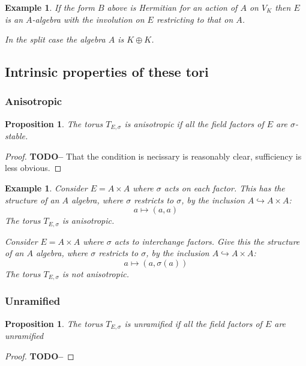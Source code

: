 \documentclass{article}
\theoremstyle{plain}
\newtheorem{proposition}[theorem]{Proposition}
\newtheorem{example}[theorem]{Example}
\theoremstyle{definition}
\numberwithin{equation}{section}
\newcommand{\TODO}[1]{\textbf{TODO-#1}}
\begin{document}
\begin{example}
If the form $B$ above is Hermitian for an action of $A$ on $V_K$ then $E$ is an $A$-algebra with the involution on $E$ restricting to that on $A$.

In the split case the algebra $A$ is $K\oplus K$.
\end{example}

\subsection{Intrinsic properties of these tori}

\subsubsection{Anisotropic}

\begin{proposition}
The torus $T_{E,\sigma}$ is anisotropic if all the field factors of $E$ are $\sigma$-stable.
\end{proposition}
\begin{proof}
\TODO-
That the condition is necissary is reasonably clear, sufficiency is less obvious.
\end{proof}

\begin{example}
Consider $E = A \times A$ where $\sigma$ acts on each factor.
This has the structure of an $A$ algebra, where $\sigma$ restricts to $\sigma$, by the inclusion $A\hookrightarrow A\times A$:
\[ a \mapsto (a,a) \]
The torus $T_{E,\sigma}$ is anisotropic.

\bigskip
Consider $E = A \times A$ where $\sigma$ acts to interchange factors.
Give this the structure of an $A$ algebra, where $\sigma$ restricts to $\sigma$, by the inclusion $A\hookrightarrow A\times A$:
\[ a \mapsto (a,\sigma(a)) \]
The torus $T_{E,\sigma}$ is not anisotropic.
\end{example}


\subsubsection{Unramified}

\begin{proposition}
The torus $T_{E,\sigma}$ is unramified if all the field factors of $E$ are unramified
\end{proposition}
\begin{proof}
\TODO-
\end{proof}
\end{document}
